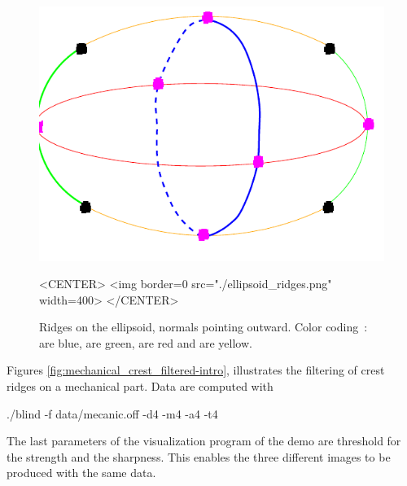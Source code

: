 \begin{figure}[!ht]
\begin{ccTexOnly}
\centerline{
\includegraphics[width=.5\linewidth]{Ridges_3/ellipsoid_ridges}}
\end{ccTexOnly}
\caption{Ridges on the ellipsoid, normals pointing outward.
 Color coding~:  are blue,
 are green,  are red and 
 are yellow. }
\label{ellipsoid_ridges_example}
\begin{ccHtmlOnly}
<CENTER> <img border=0 src="./ellipsoid_ridges.png" width=400>
</CENTER>
\end{ccHtmlOnly}
\end{figure}


Figures \ref{fig:mechanical_crest_filtered-intro}, illustrates the
filtering of crest ridges on a mechanical part. Data are computed with 
\begin{ccExampleCode}
./blind -f data/mecanic.off -d4 -m4 -a4 -t4
\end{ccExampleCode}
The last parameters of the visualization program of the demo are
threshold for the strength and the sharpness. This enables the three
different images to be produced with the same data.

